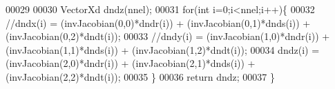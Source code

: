 \begin{DoxyCode}
00029 
00030     VectorXd dndz(nnel);
00031     \textcolor{keywordflow}{for}(\textcolor{keywordtype}{int} i=0;i<nnel;i++)\{
00032         \textcolor{comment}{//dndx(i) = (invJacobian(0,0)*dndr(i)) + (invJacobian(0,1)*dnds(i)) + (invJacobian(0,2)*dndt(i));}
00033         \textcolor{comment}{//dndy(i) = (invJacobian(1,0)*dndr(i)) + (invJacobian(1,1)*dnds(i)) + (invJacobian(1,2)*dndt(i));}
00034         dndz(i) = (invJacobian(2,0)*dndr(i)) + (invJacobian(2,1)*dnds(i)) + (invJacobian(2,2)*dndt(i));
00035     \}
00036     \textcolor{keywordflow}{return} dndz;
00037 \}
\end{DoxyCode}
